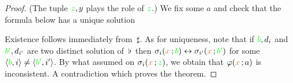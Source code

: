 \documentclass[creche.tex]{subfiles}
\begin{document}
\begin{proof}

(The tuple ${\color{green} z},y$ plays the role of ${\color{green} z}$.)  We fix some $a$ and check that the formula below has a unique solution


Existence follows immediately from $\,\sharp$. As for uniqueness, note that if ${\color{green} b},d_i$ and ${\color{green} b'},d_{i'}$ are two distinct solution of $\,\flat\,$ then $\sigma_i({\color{brown} x}\,;{\color{green} b})\leftrightarrow\sigma_{i'}({\color{brown} x}\,;{\color{green} b'})$ for some $\langle{\color{green}b},i\rangle\neq\langle{\color{green}b'},i'\rangle$. By what assumed on $\sigma_i({\color{brown} x}\,;{\color{green} z})$, we obtain that $\varphi({\color{brown} x}\,;a)$ is inconsistent. A contradiction which proves the theorem.
\end{proof}
\end{document}
